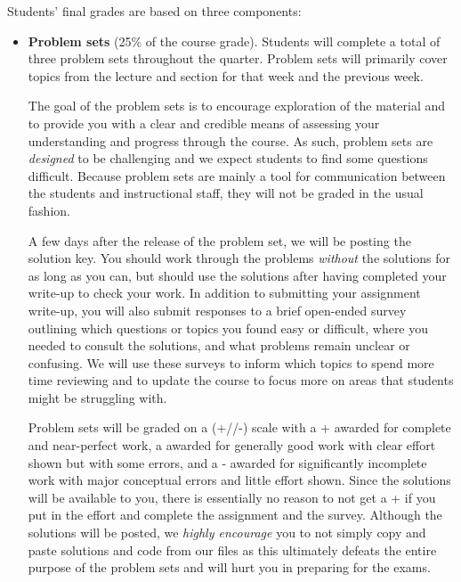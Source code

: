 \documentclass[11pt, article, oneside]{memoir}
\theoremstyle{Assumption}
\begin{document}
Students’ final grades are based on three components:
\begin{itemize}
\item \textbf{Problem sets} (25\% of the course grade). Students will complete a total of three problem sets throughout the quarter. Problem sets will primarily cover topics from the lecture and section for that week and the previous week.

The goal of the problem sets is to encourage exploration of the material and to provide you with a clear and credible means of assessing your understanding and progress through the course. As such, problem sets are \textit{designed} to be challenging and we expect students to find some questions difficult. Because problem sets are mainly a tool for communication between the students and instructional staff, they will not be graded in the usual fashion.

A few days after the release of the problem set, we will be posting the solution key. You should work through the problems \textit{without} the solutions for as long as you can, but should use the solutions after having completed your write-up to check your work. In addition to submitting your assignment write-up, you will also submit responses to a brief open-ended survey outlining which questions or topics you found easy or difficult, where you needed to consult the solutions, and what problems remain unclear or confusing. We will use these surveys to inform which topics to spend more time reviewing and to update the course to focus more on areas that students might be struggling with. 

Problem sets will be graded on a (+/\checkmark/-) scale with a + awarded for complete and near-perfect work, a \checkmark awarded for generally good work with clear effort shown but with some errors, and a - awarded for significantly incomplete work with major conceptual errors and little effort shown. Since the solutions will be available to you, there is essentially no reason to not get a + if you put in the effort and complete the assignment and the survey. Although the solutions will be posted, we \textit{highly encourage} you to not simply copy and paste solutions and code from our files as this ultimately defeats the entire purpose of the problem sets and will hurt you in preparing for the exams.
 

\end{itemize}
\end{document}
